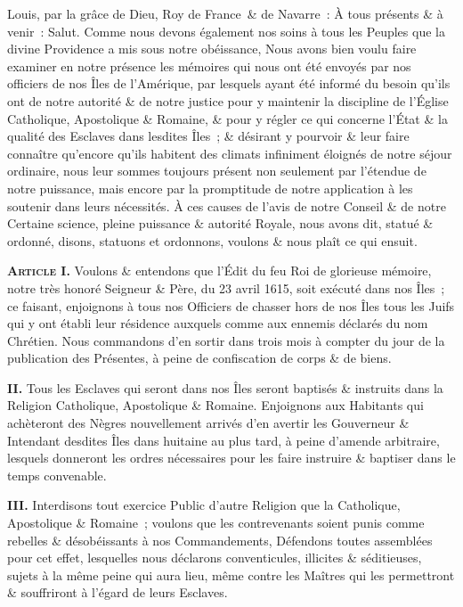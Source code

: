 \documentclass[french,twoside]{book} %
\newcommand{\labelchar}[1]{\textbf{\color{rubric} #1}}
\begin{document}
\noindent Louis, par la grâce de Dieu, Roy de France \& de Navarre : À tous présents \& à venir : Salut. Comme nous devons également nos soins à tous les Peuples que la divine Providence a mis sous notre obéissance, Nous avons bien voulu faire examiner en notre présence les mémoires qui nous ont été envoyés par nos officiers de nos Îles de l’Amérique, par lesquels ayant été informé du besoin qu’ils ont de notre autorité \& de notre justice pour y maintenir la discipline de l’Église Catholique, Apostolique \& Romaine, \& pour y régler ce qui concerne l’État \& la qualité des Esclaves dans lesdites Îles ; \& désirant y pourvoir \& leur faire connaître qu’encore qu’ils habitent des climats infiniment éloignés de notre séjour ordinaire, nous leur sommes toujours présent non seulement par l’étendue de notre puissance, mais encore par la promptitude de notre application à les soutenir dans leurs nécessités. À ces causes de l’avis de notre Conseil \& de notre Certaine science, pleine puissance \& autorité Royale, nous avons dit, statué \& ordonné, disons, statuons et ordonnons, voulons \& nous plaît ce qui ensuit.\par
\bigbreak
\noindent \labelchar{{\scshape Article} I.} Voulons \& entendons que l’Édit du feu Roi de glorieuse mémoire, notre très honoré Seigneur \& Père, du 23 avril 1615, soit exécuté dans nos Îles ; ce faisant, enjoignons à tous nos Officiers de chasser hors de nos Îles tous les Juifs qui y ont établi leur résidence auxquels comme aux ennemis déclarés du nom Chrétien. Nous commandons d’en sortir dans trois mois à compter du jour de la publication des Présentes, à peine de confiscation de corps \& de biens.\par
\labelchar{II.} Tous les Esclaves qui seront dans nos Îles seront baptisés \& instruits dans la Religion Catholique, Apostolique \& Romaine. Enjoignons aux Habitants qui achèteront des Nègres nouvellement arrivés d’en avertir les Gouverneur \& Intendant desdites Îles dans huitaine au plus tard, à peine d’amende arbitraire, lesquels donneront les ordres nécessaires pour les faire instruire \& baptiser dans le temps convenable.\par
\labelchar{III.} Interdisons tout exercice Public d’autre Religion que la Catholique, Apostolique \& Romaine ; voulons que les contrevenants soient punis comme rebelles \& désobéissants à nos Commandements, Défendons toutes assemblées pour cet effet, lesquelles nous déclarons conventicules, illicites \& séditieuses, sujets à la même peine qui aura lieu, même contre les Maîtres qui les permettront \& souffriront à l’égard de leurs Esclaves.\par
\end{document}

